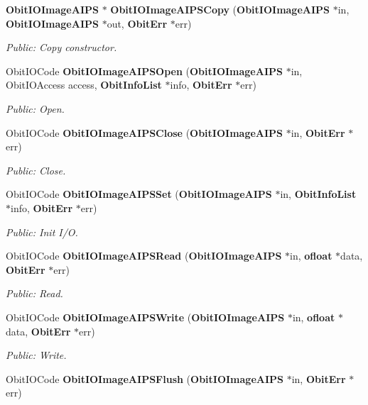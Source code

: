 \begin{CompactItemize}
{\bf Obit\-IOImage\-AIPS} $\ast$ {\bf Obit\-IOImage\-AIPSCopy} ({\bf Obit\-IOImage\-AIPS} $\ast$in, {\bf Obit\-IOImage\-AIPS} $\ast$out, {\bf Obit\-Err} $\ast$err)
\begin{CompactList}\small\item\em Public: Copy constructor. \item\end{CompactList}\item 
Obit\-IOCode {\bf Obit\-IOImage\-AIPSOpen} ({\bf Obit\-IOImage\-AIPS} $\ast$in, Obit\-IOAccess access, {\bf Obit\-Info\-List} $\ast$info, {\bf Obit\-Err} $\ast$err)
\begin{CompactList}\small\item\em Public: Open. \item\end{CompactList}\item 
Obit\-IOCode {\bf Obit\-IOImage\-AIPSClose} ({\bf Obit\-IOImage\-AIPS} $\ast$in, {\bf Obit\-Err} $\ast$err)
\begin{CompactList}\small\item\em Public: Close. \item\end{CompactList}\item 
Obit\-IOCode {\bf Obit\-IOImage\-AIPSSet} ({\bf Obit\-IOImage\-AIPS} $\ast$in, {\bf Obit\-Info\-List} $\ast$info, {\bf Obit\-Err} $\ast$err)
\begin{CompactList}\small\item\em Public: Init I/O. \item\end{CompactList}\item 
Obit\-IOCode {\bf Obit\-IOImage\-AIPSRead} ({\bf Obit\-IOImage\-AIPS} $\ast$in, {\bf ofloat} $\ast$data, {\bf Obit\-Err} $\ast$err)
\begin{CompactList}\small\item\em Public: Read. \item\end{CompactList}\item 
Obit\-IOCode {\bf Obit\-IOImage\-AIPSWrite} ({\bf Obit\-IOImage\-AIPS} $\ast$in, {\bf ofloat} $\ast$data, {\bf Obit\-Err} $\ast$err)
\begin{CompactList}\small\item\em Public: Write. \item\end{CompactList}\item 
Obit\-IOCode {\bf Obit\-IOImage\-AIPSFlush} ({\bf Obit\-IOImage\-AIPS} $\ast$in, {\bf Obit\-Err} $\ast$err)

\end{CompactItemize}
